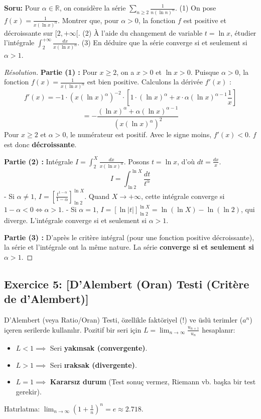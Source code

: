 \documentclass[12pt,a4paper]{report}
\begin{document}
\textbf{Soru:}
Pour $\alpha \in \mathbb{R}$, on considère la série $\sum_{n \ge 2} \frac{1}{n(\ln n)^\alpha}$.
(1) On pose $f(x) = \frac{1}{x(\ln x)^\alpha}$. Montrer que, pour $\alpha > 0$, la fonction $f$ est positive et décroissante sur $[2, +\infty[$.
(2) À l'aide du changement de variable $t = \ln x$, étudier l'intégrale $\int_2^{+\infty} \frac{dx}{x(\ln x)^\alpha}$.
(3) En déduire que la série converge si et seulement si $\alpha > 1$.

\begin{proof}[Résolution]
\textbf{Partie (1) :} Pour $x \ge 2$, on a $x > 0$ et $\ln x > 0$. Puisque $\alpha > 0$, la fonction $f(x) = \frac{1}{x(\ln x)^\alpha}$ est bien positive.
Calculons la dérivée $f'(x)$ :
\[ f'(x) = -1 \cdot (x(\ln x)^\alpha)^{-2} \cdot \left[ 1 \cdot (\ln x)^\alpha + x \cdot \alpha (\ln x)^{\alpha-1} \frac{1}{x} \right] \]
\[ = - \frac{(\ln x)^\alpha + \alpha (\ln x)^{\alpha-1}}{(x(\ln x)^\alpha)^2} \]
Pour $x \ge 2$ et $\alpha > 0$, le numérateur est positif. Avec le signe moins, $f'(x) < 0$. $f$ est donc \textbf{décroissante}.

\textbf{Partie (2) :} Intégrale $I = \int_2^{X} \frac{dx}{x(\ln x)^\alpha}$.
Posons $t = \ln x$, d'où $dt = \frac{dx}{x}$.
\[ I = \int_{\ln 2}^{\ln X} \frac{dt}{t^\alpha} \]
- Si $\alpha \neq 1$, $I = \left[ \frac{t^{1-\alpha}}{1-\alpha} \right]_{\ln 2}^{\ln X}$. Quand $X \to +\infty$, cette intégrale converge si $1-\alpha < 0 \iff \alpha > 1$.
- Si $\alpha = 1$, $I = [\ln|t|]_{\ln 2}^{\ln X} = \ln(\ln X) - \ln(\ln 2)$, qui diverge.
L'intégrale converge si et seulement si $\alpha > 1$.

\textbf{Partie (3) :} D'après le critère intégral (pour une fonction positive décroissante), la série et l'intégrale ont la même nature.
La série \textbf{converge si et seulement si} $\alpha > 1$.
\end{proof}

\subsection*{Exercice 5: [D'Alembert (Oran) Testi (Critère de d'Alembert)]}

\begin{tcolorbox}[colback=teal!5!white,colframe=teal!75!black,title=Hatırlatma (Rappel): D'Alembert Kriteri]
D'Alembert (veya Ratio/Oran) Testi, özellikle faktöriyel (!) ve üslü terimler ($a^n$) içeren serilerde kullanılır.
Pozitif bir seri için $L = \lim_{n \to \infty} \frac{u_{n+1}}{u_n}$ hesaplanır:
\begin{itemize}
    \item $L < 1 \implies$ Seri \textbf{yakınsak (convergente)}.
    \item $L > 1 \implies$ Seri \textbf{ıraksak (divergente)}.
    \item $L = 1 \implies$ \textbf{Kararsız durum} (Test sonuç vermez, Riemann vb. başka bir test gerekir).
\end{itemize}
Hatırlatma: $\lim_{n \to \infty} \left(1 + \frac{1}{n}\right)^n = e \approx 2.718$.
\end{tcolorbox}
\end{document}

